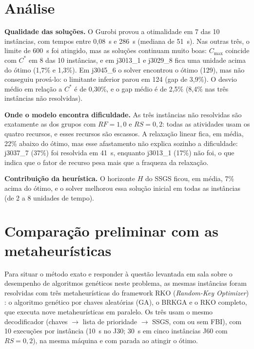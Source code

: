 \documentclass[11pt,a4paper]{article}
\newcommand{\cmax}{C_{\max}}
\begin{document}
\section*{Análise}

\textbf{Qualidade das soluções.} O Gurobi provou a otimalidade em 7 das 10 instâncias, com tempos
entre 0,08~s e 286~s (mediana de 51~s). Nas outras três, o limite de 600~s foi atingido, mas as
soluções continuam muito boas: $\cmax$ coincide com $C^*$ em 8 das 10 instâncias, e em j3013\_1 e
j3029\_8 fica uma unidade acima do ótimo (1,7\% e 1,3\%). Em j3045\_6 o solver encontrou o ótimo
(129), mas não conseguiu prová-lo: o limitante inferior parou em 124 (gap de 3,9\%). O desvio
médio em relação a $C^*$ é de 0,30\%, e o gap médio é de 2,5\% (8,4\% nas três instâncias não
resolvidas).

\textbf{Onde o modelo encontra dificuldade.} As três instâncias não resolvidas são exatamente as
dos grupos com $RF = 1{,}0$ e $RS = 0{,}2$: todas as atividades usam os quatro recursos, e esses
recursos são escassos. A relaxação linear fica, em média, 22\% abaixo do ótimo, mas esse
afastamento não explica sozinho a dificuldade: j3037\_7 (37\%) foi resolvida em 41~s, enquanto
j3013\_1 (17\%) não foi, o que indica que o fator de recurso pesa mais que a fraqueza da relaxação.

\textbf{Contribuição da heurística.} O horizonte $H$ do SSGS ficou, em média, 7\% acima do ótimo,
e o solver melhorou essa solução inicial em todas as instâncias (de 2 a 8 unidades de tempo).

\section*{Comparação preliminar com as metaheurísticas}

Para situar o método exato e responder à questão levantada em sala sobre o desempenho de
algoritmos genéticos neste problema, as mesmas instâncias foram resolvidas com três metaheurísticas
do framework RKO (\emph{Random-Key Optimizer}) \cite{rko}: o algoritmo genético por chaves
aleatórias (GA), o BRKGA \cite{brkga} e o RKO completo, que executa nove metaheurísticas em
paralelo. Os três usam o mesmo decodificador (chaves $\to$ lista de prioridade $\to$ SSGS, com ou
sem FBI), com 10 execuções por instância (10~s no J30; 30~s em cinco instâncias J60 com $RS = 0{,}2$),
na mesma máquina e com parada ao atingir o ótimo.
\end{document}
